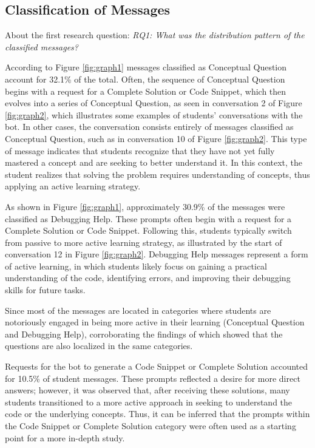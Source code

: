 \documentclass[a4paper,twoside]{article}
\begin{document}
\subsection{Classification of Messages}

About the first research question: \textit{RQ1: What was the distribution
pattern of the classified messages?}

According to Figure \ref{fig:graph1} messages classified as
Conceptual Question account for 32.1\% of the total. Often, the sequence of
Conceptual Question begins with a request for a Complete Solution or Code
Snippet, which then evolves into a series of Conceptual Question, as seen in
conversation 2 of Figure \ref{fig:graph2}, which illustrates some examples of
students' conversations with the bot. In other cases, the conversation
consists entirely of messages classified as Conceptual Question, such as in
conversation 10 of Figure \ref{fig:graph2}. This type of message indicates that
students recognize that they have not yet fully mastered a concept and are
seeking to better understand it. In this context, the student realizes that
solving the problem requires understanding of concepts, thus applying an active
learning strategy.

As shown in Figure \ref{fig:graph1}, approximately 30.9\% of the messages were
classified as Debugging Help. These prompts often begin with a request for a
Complete Solution or Code Snippet. Following this, students typically switch from
passive to more active learning strategy, as illustrated by the start
of conversation 12 in Figure \ref{fig:graph2}. Debugging Help messages represent
a form of active learning, in which students likely focus on gaining a practical
understanding of the code, identifying errors, and improving their debugging
skills for future tasks.

Since most of the messages are located in categories where students are
notoriously engaged in being more active in their learning (Conceptual Question
and Debugging Help), corroborating the findings of \cite{Ghimire24} which
showed that the questions are also localized in the same categories.

Requests for the bot to generate a Code Snippet or Complete Solution accounted
for 10.5\% of student messages. These prompts reflected a desire for more
direct answers; however, it was observed that, after receiving these solutions,
many students transitioned to a more active approach in seeking to understand
the code or the underlying concepts. Thus, it can be inferred that the prompts
within the Code Snippet or Complete Solution category were often used as a
starting point for a more in-depth study.
\end{document}
